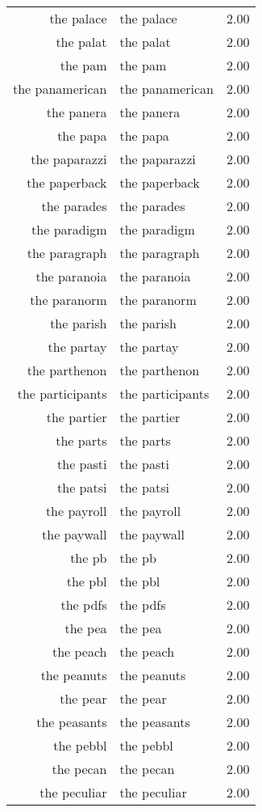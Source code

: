 \begin{table}[ht]
\begin{tabular}{rlr}
  the palace & the palace & 2.00 \\ 
  the palat & the palat & 2.00 \\ 
  the pam & the pam & 2.00 \\ 
  the panamerican & the panamerican & 2.00 \\ 
  the panera & the panera & 2.00 \\ 
  the papa & the papa & 2.00 \\ 
  the paparazzi & the paparazzi & 2.00 \\ 
  the paperback & the paperback & 2.00 \\ 
  the parades & the parades & 2.00 \\ 
  the paradigm & the paradigm & 2.00 \\ 
  the paragraph & the paragraph & 2.00 \\ 
  the paranoia & the paranoia & 2.00 \\ 
  the paranorm & the paranorm & 2.00 \\ 
  the parish & the parish & 2.00 \\ 
  the partay & the partay & 2.00 \\ 
  the parthenon & the parthenon & 2.00 \\ 
  the participants & the participants & 2.00 \\ 
  the partier & the partier & 2.00 \\ 
  the parts & the parts & 2.00 \\ 
  the pasti & the pasti & 2.00 \\ 
  the patsi & the patsi & 2.00 \\ 
  the payroll & the payroll & 2.00 \\ 
  the paywall & the paywall & 2.00 \\ 
  the pb & the pb & 2.00 \\ 
  the pbl & the pbl & 2.00 \\ 
  the pdfs & the pdfs & 2.00 \\ 
  the pea & the pea & 2.00 \\ 
  the peach & the peach & 2.00 \\ 
  the peanuts & the peanuts & 2.00 \\ 
  the pear & the pear & 2.00 \\ 
  the peasants & the peasants & 2.00 \\ 
  the pebbl & the pebbl & 2.00 \\ 
  the pecan & the pecan & 2.00 \\ 
  the peculiar & the peculiar & 2.00 \\ 

\end{tabular}
\end{table}
